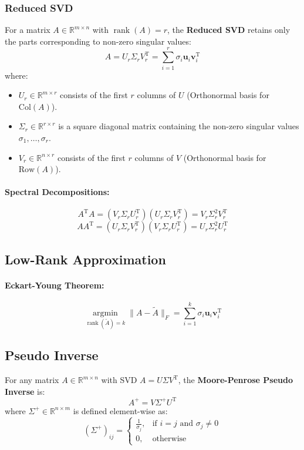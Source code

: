 \documentclass{article}
\begin{document}
\subsubsection{Reduced SVD}
For a matrix $A \in \mathbb{R}^{m \times n}$ with $\operatorname{rank}(A) = r$, the \textbf{Reduced SVD} retains only the parts corresponding to non-zero singular values:
\[
    A = U_r \Sigma_r V_r^{\mathrm{T}} = \sum_{i=1}^{r} \sigma_i \mathbf{u}_i \mathbf{v}_i^{\mathrm{T}}
\]
where:
\begin{itemize}
    \item $U_r \in \mathbb{R}^{m \times r}$ consists of the first $r$ columns of $U$ (Orthonormal basis for $\text{Col}(A)$).
    \item $\Sigma_r \in \mathbb{R}^{r \times r}$ is a square diagonal matrix containing the non-zero singular values $\sigma_1, \dots, \sigma_r$.
    \item $V_r \in \mathbb{R}^{n \times r}$ consists of the first $r$ columns of $V$ (Orthonormal basis for $\text{Row}(A)$).
\end{itemize}

\paragraph{Spectral Decompositions:}
\[
    A^{\mathrm{T}} A = (V_r \Sigma_r U_r^{\mathrm{T}}) (U_r \Sigma_r V_r^{\mathrm{T}}) = V_r \Sigma_r^2 V_r^{\mathrm{T}}
\]
\[
    A A^{\mathrm{T}} = (U_r \Sigma_r V_r^{\mathrm{T}}) (V_r \Sigma_r U_r^{\mathrm{T}}) = U_r \Sigma_r^2 U_r^{\mathrm{T}}
\]

\subsection{Low-Rank Approximation}
\paragraph{Eckart-Young Theorem:}
\[
    \underset{\operatorname{rank}(\tilde{A})=k}{\operatorname{argmin}} \|A - \tilde{A}\|_F = \sum_{i=1}^{k} \sigma_i \mathbf{u}_i \mathbf{v}_i^{\mathrm{T}}
\]

\subsection{Pseudo Inverse}
For any matrix $A \in \mathbb{R}^{m \times n}$ with SVD $A = U \Sigma V^{\mathrm{T}}$, the \textbf{Moore-Penrose Pseudo Inverse} is:
\[
    A^+ = V \Sigma^+ U^{\mathrm{T}}
\]
where $\Sigma^+ \in \mathbb{R}^{n \times m}$ is defined element-wise as:
\[
    (\Sigma^+)_{ij} =
    \begin{cases}
        \frac{1}{\sigma_j}, & \text{if } i = j \text{ and } \sigma_j \neq 0 \\
        0, & \text{otherwise}
    \end{cases}
\]
\end{document}
